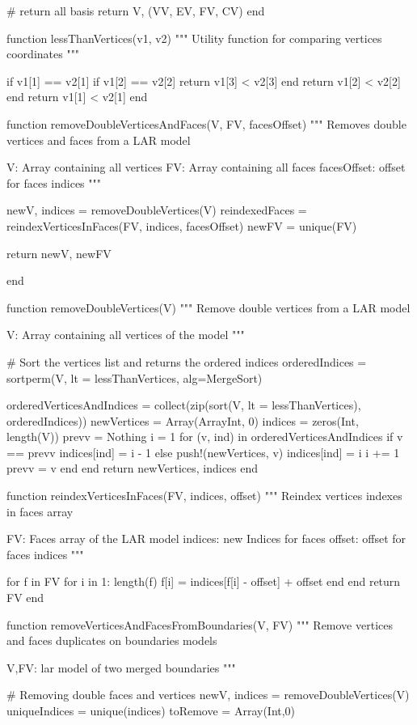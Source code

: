 \documentclass[11pt,oneside]{article}	%
\begin{document}
{  # return all basis
  return V, (VV, EV, FV, CV)
end

function lessThanVertices(v1, v2)
  """
  Utility function for comparing vertices coordinates
  """

  if v1[1] == v2[1]
    if v1[2] == v2[2]
      return v1[3] < v2[3]
    end
    return v1[2] < v2[2]
  end
  return v1[1] < v2[1]
end

function removeDoubleVerticesAndFaces(V, FV, facesOffset)
  """
  Removes double vertices and faces from a LAR model

  V: Array containing all vertices
  FV: Array containing all faces
  facesOffset: offset for faces indices
  """

  newV, indices = removeDoubleVertices(V)
  reindexedFaces = reindexVerticesInFaces(FV, indices, facesOffset)
  newFV = unique(FV)

  return newV, newFV

end

function removeDoubleVertices(V)
  """
  Remove double vertices from a LAR model

  V: Array containing all vertices of the model
  """

  # Sort the vertices list and returns the ordered indices
  orderedIndices = sortperm(V, lt = lessThanVertices, alg=MergeSort)

  orderedVerticesAndIndices = collect(zip(sort(V, lt = lessThanVertices),
                                          orderedIndices))
  newVertices = Array(Array{Int}, 0)
  indices = zeros(Int, length(V))
  prevv = Nothing
  i = 1
  for (v, ind) in orderedVerticesAndIndices
    if v == prevv
      indices[ind] = i - 1
    else
      push!(newVertices, v)
      indices[ind] = i
      i += 1
      prevv = v
    end
  end
  return newVertices, indices
end

function reindexVerticesInFaces(FV, indices, offset)
  """
  Reindex vertices indexes in faces array

  FV: Faces array of the LAR model
  indices: new Indices for faces
  offset: offset for faces indices
  """

  for f in FV
    for i in 1: length(f)
      f[i] = indices[f[i] - offset] + offset
    end
  end
  return FV
end

function removeVerticesAndFacesFromBoundaries(V, FV)
  """
  Remove vertices and faces duplicates on
  boundaries models
  
  V,FV: lar model of two merged boundaries
  """
  
  # Removing double faces and vertices
  newV, indices = removeDoubleVertices(V)
  uniqueIndices = unique(indices)
  toRemove = Array(Int,0)

}
\end{document}
